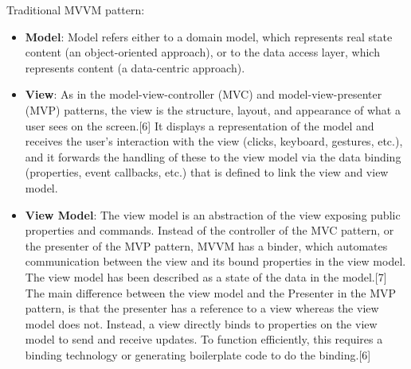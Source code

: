 \documentclass[numbers=noenddot, 12pt, a4paper, oneside]{scrbook}
\begin{document}
Traditional MVVM pattern:
\begin{itemize}
	\item \textbf{Model}: Model refers either to a domain model, which represents real state content (an object-oriented approach), or to the data access layer, which represents content (a data-centric approach).
	\item \textbf{View}: As in the model-view-controller (MVC) and model-view-presenter (MVP) patterns, the view is the structure, layout, and appearance of what a user sees on the screen.[6] It displays a representation of the model and receives the user's interaction with the view (clicks, keyboard, gestures, etc.), and it forwards the handling of these to the view model via the data binding (properties, event callbacks, etc.) that is defined to link the view and view model.
	\item \textbf{View Model}: The view model is an abstraction of the view exposing public properties and commands. Instead of the controller of the MVC pattern, or the presenter of the MVP pattern, MVVM has a binder, which automates communication between the view and its bound properties in the view model. The view model has been described as a state of the data in the model.[7]
The main difference between the view model and the Presenter in the MVP pattern, is that the presenter has a reference to a view whereas the view model does not. Instead, a view directly binds to properties on the view model to send and receive updates. To function efficiently, this requires a binding technology or generating boilerplate code to do the binding.[6]
\end{itemize}
\end{document}
